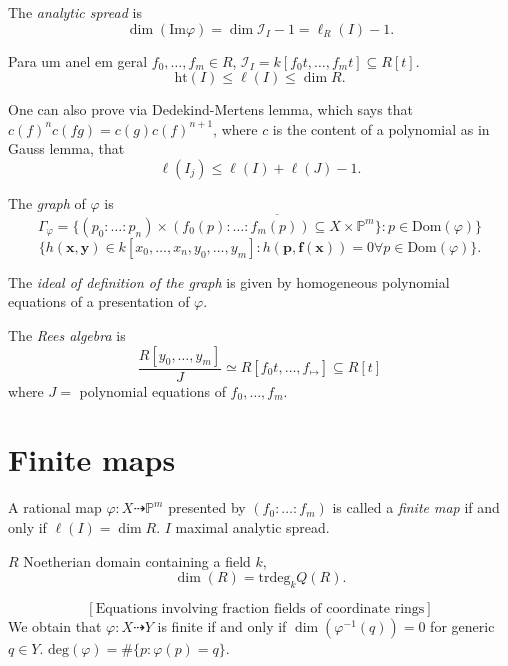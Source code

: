 The {\it analytic spread} is
$$
\dim(\text{Im}\varphi)
=\dim \mathcal{I}_I-1
=\ell_R(I)-1.
$$

Para um anel em geral
$f_0,…,f_m \in R$,
$\mathcal{I}_I=k[f_0t,…,f_mt] \subseteq
R[t]$.
$$
\text{ht}(I) \leq  \ell(I) \leq  \dim R.
$$

One can also prove via Dedekind-Mertens
lemma,
which says that
$c(f)^nc(fg)=c(g)c(f)^{n+1}$,
where $c$ is the content of a polynomial
as in Gauss lemma,
that
$$
\ell(I_j) \leq  \ell(I) + \ell(J)-1.
$$

\medskip\noindent
The {\it graph} of $\varphi$ is
$$
\Gamma_\varphi
= \overline{\{(p_0:…:p_n)\times
(f_0(p):…:f_m(p))
\subseteq X \times \mathbb{P}^m\}:
p \in \text{Dom}(\varphi)\}}
$$
$$
\{
h(\mathbf{x},\mathbf{y})
\in k[x_0,…,x_n,y_0,…,y_m]
:h(\mathbf{p},\mathbf{f}(\mathbf{x}))=0
\forall p \in \text{Dom}(\varphi)\}.
$$

The  {\it ideal of definition of the graph}
is given by homogeneous polynomial equations
of a presentation of $\varphi$.

The {\it Rees algebra} is
$$
\frac{R[y_0,…,y_m]}{J}
\simeq R[f_0t,…,f_\mapsto ] \subseteq R[t]
$$
where $J = $ polynomial equations of
$f_0,…,f_m$.


\section{Finite maps}
\label{section-finite-maps}


\begin{definition}
\label{definition-finite-map}
A rational map $\varphi:X \dashrightarrow
\mathbb{P}^m$
presented by $(f_0:…:f_m)$
is called a {\it finite map} if and only if
$\ell(I) = \dim R$.
$I$ maximal analytic spread.
\end{definition}


\medskip{}

\begin{theorem}[Matsumura 5.6]
\label{theorem-matsumura-5.6}
$R$ Noetherian domain containing a field $k$,
$$
\dim (R) = \text{trdeg}_k Q(R).
$$
\end{theorem}

$$
[\text{Equations involving fraction fields of
coordinate rings}]
$$
We obtain that
$\varphi:X \dashrightarrow Y$
is finite if and only if
$\dim(\varphi^{-1}(q))=0$ for generic $q \in
Y$.
$\text{deg}(\varphi)=\# \{p :
\varphi(p)=q\}$.

